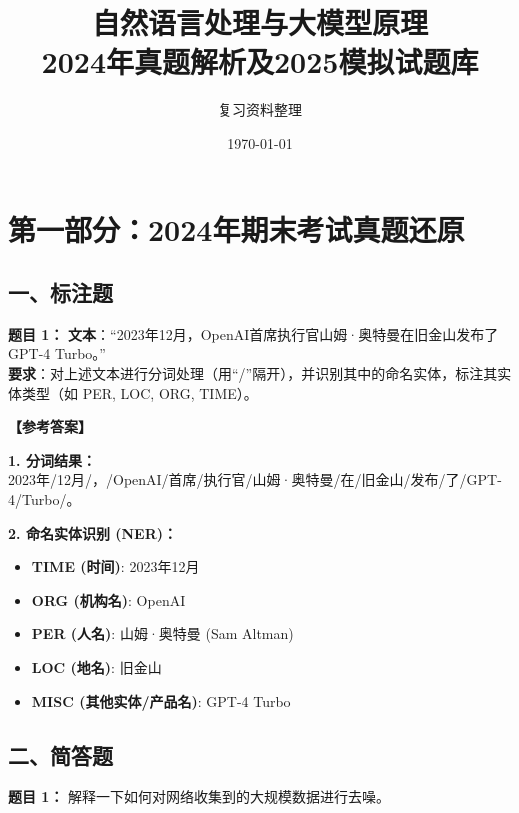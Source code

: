 \documentclass[a4paper,11pt]{article}
\title{\textbf{自然语言处理与大模型原理}\\2024年真题解析及2025模拟试题库}
\author{复习资料整理}
\date{\today}
\newenvironment{question}[1]
    {\vspace{0.5cm}\noindent\textbf{题目 #1：}}
    {\vspace{0.2cm}}
\newenvironment{answer}
    {\noindent\textbf{【参考答案】}\par\small\color{blue}}
    {\par\vspace{0.5cm}\normalcolor}
\begin{document}
\maketitle
\tableofcontents
\newpage

\section{第一部分：2024年期末考试真题还原}

\subsection{一、标注题}

\begin{question}{1}
\textbf{文本}：“2023年12月，OpenAI首席执行官山姆·奥特曼在旧金山发布了GPT-4 Turbo。”\\
\textbf{要求}：对上述文本进行分词处理（用“/”隔开），并识别其中的命名实体，标注其实体类型（如 PER, LOC, ORG, TIME）。
\end{question}

\begin{answer}
\textbf{1. 分词结果：}\\
2023年/12月/，/OpenAI/首席/执行官/山姆·奥特曼/在/旧金山/发布/了/GPT-4/Turbo/。

\textbf{2. 命名实体识别 (NER)：}
\begin{itemize}
    \item \textbf{TIME (时间)}: 2023年12月
    \item \textbf{ORG (机构名)}: OpenAI
    \item \textbf{PER (人名)}: 山姆·奥特曼 (Sam Altman)
    \item \textbf{LOC (地名)}: 旧金山
    \item \textbf{MISC (其他实体/产品名)}: GPT-4 Turbo
\end{itemize}
\end{answer}

\subsection{二、简答题}

\begin{question}{1}
解释一下如何对网络收集到的大规模数据进行去噪。
\end{question}
\end{document}
